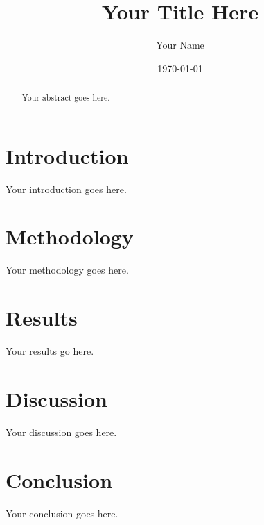 \documentclass{article}
\title{Your Title Here}
\author{Your Name}
\date{\today}
\begin{document}
\maketitle

\begin{abstract}
Your abstract goes here.
\end{abstract}

\section{Introduction}
Your introduction goes here.

\section{Methodology}
Your methodology goes here.

\section{Results}
Your results go here.

\section{Discussion}
Your discussion goes here.

\section{Conclusion}
Your conclusion goes here.



\end{document}
